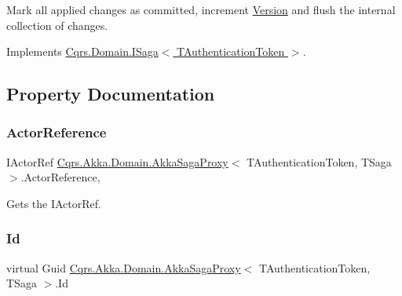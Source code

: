Mark all applied changes as committed, increment \hyperlink{classCqrs_1_1Akka_1_1Domain_1_1AkkaSagaProxy_ab6272400fe5c6227a11cf5c93f752d4d_ab6272400fe5c6227a11cf5c93f752d4d}{Version} and flush the internal collection of changes. 



Implements \hyperlink{interfaceCqrs_1_1Domain_1_1ISaga_a85c75f80bc5be4bad7f1d9f1231bfba7_a85c75f80bc5be4bad7f1d9f1231bfba7}{Cqrs.\+Domain.\+I\+Saga$<$ T\+Authentication\+Token $>$}.



\subsection{Property Documentation}
\mbox{\label{classCqrs_1_1Akka_1_1Domain_1_1AkkaSagaProxy_a5f1a7eae545d74336856ca7ec7625334_a5f1a7eae545d74336856ca7ec7625334}} 
\subsubsection{\texorpdfstring{Actor\+Reference}{ActorReference}}
{\footnotesize\ttfamily I\+Actor\+Ref \hyperlink{classCqrs_1_1Akka_1_1Domain_1_1AkkaSagaProxy}{Cqrs.\+Akka.\+Domain.\+Akka\+Saga\+Proxy}$<$ T\+Authentication\+Token, T\+Saga $>$.Actor\+Reference\hspace{0.3cm}{\ttfamily [get]}, {\ttfamily [set]}}



Gets the I\+Actor\+Ref. 

\mbox{\label{classCqrs_1_1Akka_1_1Domain_1_1AkkaSagaProxy_acb65bb91f7dfacc6eca8e12b6a772b20_acb65bb91f7dfacc6eca8e12b6a772b20}} 
\subsubsection{\texorpdfstring{Id}{Id}}
{\footnotesize\ttfamily virtual Guid \hyperlink{classCqrs_1_1Akka_1_1Domain_1_1AkkaSagaProxy}{Cqrs.\+Akka.\+Domain.\+Akka\+Saga\+Proxy}$<$ T\+Authentication\+Token, T\+Saga $>$.Id\hspace{0.3cm}{\ttfamily [get]}}



